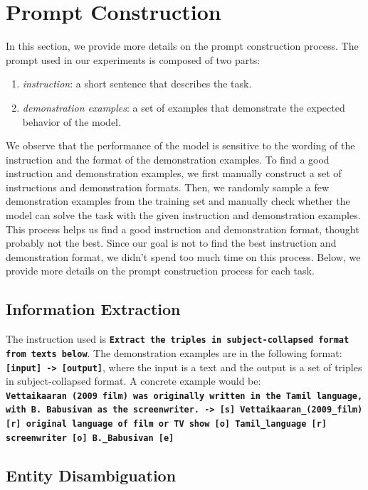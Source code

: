 \section{Prompt Construction}\label{app_sec:prompt_construction}

In this section, we provide more details on the prompt construction process.
The prompt used in our experiments is composed of two parts:
\begin{enumerate}
    \item \textit{instruction}: a short sentence that describes the task.
    \item \textit{demonstration examples}: a set of examples that demonstrate the expected behavior of the model.
\end{enumerate}
%
We observe that the performance of the model is sensitive to the wording of the instruction and the format of the demonstration examples.
To find a good instruction and demonstration examples, we first manually construct a set of instructions and demonstration formats.
Then, we randomly sample a few demonstration examples from the training set and manually check whether the model can solve the task with the given instruction and demonstration examples.
This process helps us find a good instruction and demonstration format, thought probably not the best.
Since our goal is not to find the best instruction and demonstration format, we didn't spend too much time on this process.
%
Below, we provide more details on the prompt construction process for each task.

\subsection{Information Extraction}\label{app_subsec:information-extraction}
The instruction used is \textbf{\texttt{Extract the triples in subject-collapsed format from texts below}}.
%
The demonstration examples are in the following format:
\textbf{\texttt{[input] -> [output]}}, where the input is a text and the output is a set of triples in subject-collapsed format.
A concrete example would be: \\
\textbf{\texttt{Vettaikaaran (2009 film) was originally written in the Tamil language, with B. Babusivan as the screenwriter. -> [s]
    Vettaikaaran\_(2009\_film) [r] original language of film or TV show [o] Tamil\_language [r] screenwriter [o] B.\_Babusivan [e]}}


\subsection{Entity Disambiguation}\label{app_subsec:entity-disambiguation}

